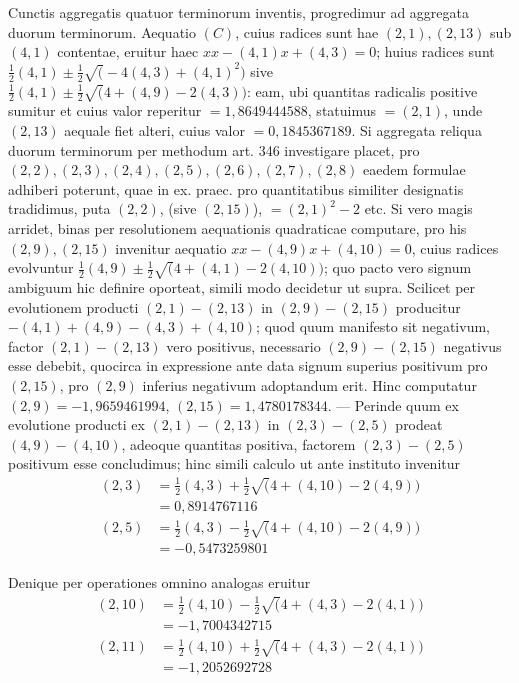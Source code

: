 Cunctis aggregatis quatuor terminorum inventis, progredimur ad aggregata duorum terminorum. Aequatio \((C)\), cuius radices sunt hae \((2,1),\allowbreak (2,13)\) sub \((4,1)\) contentae, eruitur haec \(xx-(4,1)x+(4,3)=0\); huius radices sunt \(\frac12(4,1)\pm\frac12\surd(-4(4,3)+(4,1)^2)\) sive \(\frac12(4,1)\pm\frac12\surd(4+(4,9)-2(4,3))\): eam, ubi quantitas radicalis positive sumitur et cuius valor reperitur \(=1{,}8649444588\), statuimus \(=(2,1)\), unde \((2,13)\) aequale fiet alteri, cuius valor \(=0{,}1845367189\). Si aggregata reliqua duorum terminorum per methodum art. 346 investigare placet, pro \((2,2),\allowbreak (2,3),\allowbreak (2,4),\allowbreak (2,5),\allowbreak (2,6),\allowbreak (2,7),\allowbreak (2,8)\) eaedem formulae adhiberi poterunt, quae in ex. praec. pro quantitatibus similiter designatis tradidimus, puta \((2,2)\), (sive \((2,15)\)), \(=(2,1)^2-2\) etc. Si vero magis arridet, binas per resolutionem aequationis quadraticae computare, pro his \((2,9),\allowbreak (2,15)\) invenitur aequatio \(xx-(4,9)x+(4,10)=0\), cuius radices evolvuntur \(\frac12(4,9)\pm\frac12\surd(4+(4,1)-2(4,10))\); quo pacto vero signum ambiguum hic definire oporteat, simili modo decidetur ut supra. Scilicet per evolutionem producti \((2,1)-(2,13)\) in \((2,9)-(2,15)\) producitur \(-(4,1)+(4,9)-(4,3)+(4,10)\); quod quum manifesto sit negativum, factor \((2,1)-(2,13)\) vero positivus, necessario \((2,9)-(2,15)\)
negativus esse debebit, quocirca in expressione ante data signum superius positivum pro \((2,15)\), pro \((2,9)\) inferius negativum adoptandum erit. Hinc computatur \((2,9)=-1{,}9659461994\), \((2,15)=1{,}4780178344\). — Perinde quum ex evolutione producti ex \((2,1)-(2,13)\) in \((2,3)-(2,5)\) prodeat \((4,9)-(4,10)\), adeoque quantitas positiva, factorem \((2,3)-(2,5)\) positivum esse concludimus; hinc simili calculo ut ante instituto invenitur \[\begin{aligned}(2,3)&=\tfrac12(4,3)+\tfrac12\surd(4+(4,10)-2(4,9))\\&=0{,}8914767116\\(2,5)&=\tfrac12(4,3)-\tfrac12\surd(4+(4,10)-2(4,9))\\&=-0{,}5473259801\end{aligned}\]

Denique per operationes omnino analogas eruitur \[\begin{aligned}(2,10)&=\tfrac12(4,10)-\tfrac12\surd(4+(4,3)-2(4,1))\\&=-1{,}7004342715\\(2,11)&=\tfrac12(4,10)+\tfrac12\surd(4+(4,3)-2(4,1))\\&=-1{,}2052692728\end{aligned}\]


